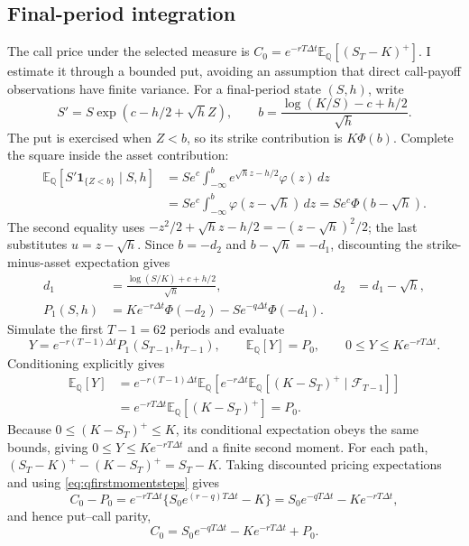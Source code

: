 \documentclass[11pt,a4paper]{article}
\newcommand{\E}{\mathbb E}
\newcommand{\Q}{\mathbb Q}
\newcommand{\F}{\mathcal F}
\newcommand{\ind}{\mathbf 1}
\newcommand{\dt}{\Delta t}
\theoremstyle{remark}
\begin{document}
\subsection{Final-period integration}
The call price under the selected measure is $C_0=e^{-rT\dt}\E_{\Q}[(S_T-K)^+]$. I estimate it through a bounded put, avoiding an assumption that direct call-payoff observations have finite variance. For a final-period state $(S,h)$, write
\begin{equation}
 S'=S\exp(c-h/2+\sqrt hZ),\qquad
 b=\frac{\log(K/S)-c+h/2}{\sqrt h}.
\end{equation}
The put is exercised when $Z<b$, so its strike contribution is $K\Phi(b)$. Complete the square inside the asset contribution:
\begin{align}
 \E_{\Q}[S'\ind_{\{Z<b\}}\mid S,h]
 &=Se^c\int_{-\infty}^{b}e^{\sqrt hz-h/2}\varphi(z)\,dz\nonumber\\
 &=Se^c\int_{-\infty}^{b}\varphi(z-\sqrt h)\,dz
 =Se^c\Phi(b-\sqrt h).
\end{align}
The second equality uses $-z^2/2+\sqrt hz-h/2=-(z-\sqrt h)^2/2$; the last substitutes $u=z-\sqrt h$. Since $b=-d_2$ and $b-\sqrt h=-d_1$, discounting the strike-minus-asset expectation gives
\begin{align}
 d_1&=\frac{\log(S/K)+c+h/2}{\sqrt h}, & d_2&=d_1-\sqrt h,\nonumber\\
 P_1(S,h)&=Ke^{-r\dt}\Phi(-d_2)-Se^{-q\dt}\Phi(-d_1).
 \label{eq:lastput}
\end{align}
Simulate the first $T-1=62$ periods and evaluate
\begin{equation}
 Y=e^{-r(T-1)\dt}P_1(S_{T-1},h_{T-1}),\qquad
 \E_{\Q}[Y]=P_0,\qquad 0\leq Y\leq Ke^{-rT\dt}.
 \label{eq:boundedput}
\end{equation}
Conditioning explicitly gives
\begin{align}
 \E_{\Q}[Y]
 &=e^{-r(T-1)\dt}\E_{\Q}\!\left[
       e^{-r\dt}\E_{\Q}[(K-S_T)^+\mid\F_{T-1}]\right]\nonumber\\
 &=e^{-rT\dt}\E_{\Q}[(K-S_T)^+]=P_0.
\end{align}
Because $0\leq(K-S_T)^+\leq K$, its conditional expectation obeys the same bounds, giving $0\leq Y\leq Ke^{-rT\dt}$ and a finite second moment. For each path,
$(S_T-K)^+-(K-S_T)^+=S_T-K$. Taking discounted pricing expectations and using \eqref{eq:qfirstmomentsteps} gives
\begin{equation}
 C_0-P_0=e^{-rT\dt}\{S_0e^{(r-q)T\dt}-K\}
        =S_0e^{-qT\dt}-Ke^{-rT\dt},
\end{equation}
and hence put--call parity,
\begin{equation}
 C_0=S_0e^{-qT\dt}-Ke^{-rT\dt}+P_0.
 \label{eq:parity}
\end{equation}
\end{document}

